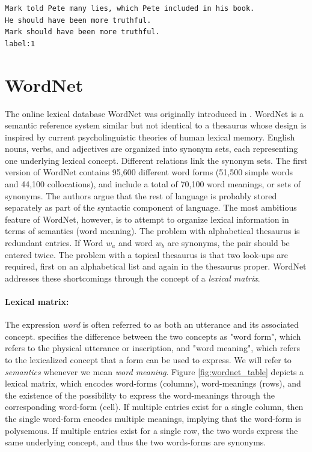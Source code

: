 \documentclass[a4paper,12pt,oneside,openright]{report}
\begin{document}
\begin{tcolorbox}
\begin{verbatim}
Mark told Pete many lies, which Pete included in his book. 
He should have been more truthful.	
Mark should have been more truthful.
label:1
\end{verbatim}
\end{tcolorbox}


\section{WordNet}

The online lexical database WordNet was originally introduced in \cite{miller90}.
WordNet is a semantic reference system similar but not identical to a thesaurus whose design is inspired by current psycholinguistic theories of human lexical memory.
English nouns, verbs, and adjectives are organized into synonym sets, each representing one underlying lexical concept.
Different relations link the synonym sets.
The first version of WordNet contains 95,600 different word forms (51,500 simple words and 44,100 collocations), and include a total of 70,100 word meanings, or sets of synonyms.
The authors argue that the rest of language is probably stored separately as part of the syntactic component of language.
The most ambitious feature of WordNet, however, is to attempt to organize lexical information in terms of semantics (word meaning). The problem with alphabetical thesaurus is redundant entries. If Word $w_a$ and word $w_b$ are synonyms, the pair should be entered twice.
The problem with a topical thesaurus is that two look-ups are required, first on an alphabetical list and again in the thesaurus proper.
WordNet addresses these shortcomings through the concept of a \textit{lexical matrix}.

\paragraph{Lexical matrix:} 
The expression \textit{word} is often referred to as both an utterance and its associated concept.
\cite{miller90} specifies the difference between the two concepts as "word form", which refers to the physical utterance or inscription, and "word meaning", which refers to the lexicalized concept that a form can be used to express.
We will refer to \textit{semantics} whenever we mean \textit{word meaning}.
Figure \ref{fig:wordnet_table} depicts a lexical matrix, which encodes word-forms (columns), word-meanings (rows), and the existence of the possibility to express the word-meanings through the corresponding word-form (cell).
If multiple entries exist for a single column, then the single word-form encodes multiple meanings, implying that the word-form is polysemous.
If multiple entries exist for a single row, the two words express the same underlying concept, and thus the two words-forms are synonyms.
\end{document}
